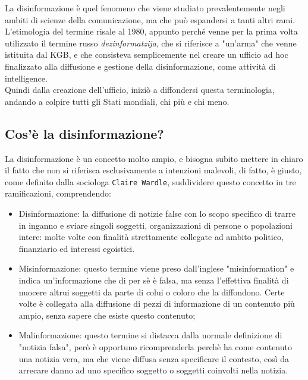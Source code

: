\documentclass{article}
\begin{document}
\begin{justify}
    La disinformazione è quel fenomeno che viene studiato prevalentemente negli ambiti di scienze della comunicazione, ma che può espandersi a tanti altri rami.
    L'etimologia del termine risale al 1980, appunto perché venne per la prima volta utilizzato il termine russo \textit{dezinformatzija}, che si riferisce a "un'arma" che venne istituita dal KGB, e che consisteva semplicemente nel creare un ufficio ad hoc finalizzato alla diffusione e gestione della disinformazione, come attività di intelligence.\citep{DisWiki}\\
    Quindi dalla creazione dell'ufficio, iniziò a diffondersi questa terminologia, andando a colpire tutti gli Stati mondiali, chi più e chi meno.
\end{justify}

\centering\subsection{Cos'è la disinformazione?}

\begin{justify}
    La disinformazione è un concetto molto ampio, e bisogna subito mettere in chiaro il fatto che non si riferisca esclusivamente a intenzioni malevoli, di fatto, è giusto, come definito dalla sociologa \texttt{Claire Wardle}, suddividere questo concetto in tre ramificazioni, comprendendo:
\begin{itemize}
    \item Disinformazione: la diffusione di notizie false con lo scopo specifico di trarre in inganno e sviare singoli soggetti, organizzazioni di persone o popolazioni intere: molte volte con finalità strettamente collegate ad ambito politico, finanziario ed interessi egoistici.
    \item Misinformazione: questo termine viene preso dall'inglese "misinformation" e indica un'informazione che di per sè è falsa, ma senza l'effettiva finalità di nuocere altrui soggetti da parte di colui o coloro che la diffondono. Certe volte è collegata alla diffusione di pezzi di informazione di un contenuto più ampio, senza sapere che esiste questo contenuto;
    \item Malinformazione: questo termine si distacca dalla normale definizione di "notizia falsa", però è opportuno ricomprenderla perchè ha come contenuto una notizia vera, ma che viene diffusa senza specificare il contesto, così da arrecare danno ad uno specifico soggetto o soggetti coinvolti nella notizia. \citep{wardle2018information}
\end{itemize}
\end{justify}
\end{document}
